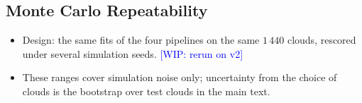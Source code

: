 \documentclass[twoside]{article}
\newcommand{\WIP}[1]{\textcolor{blue}{[WIP: #1]}}
\begin{document}
\subsection{Monte Carlo Repeatability}
\label{app:score-repeat}

\begin{itemize}
  \item Design: the same fits of the four pipelines on the same $1\,440$ clouds, rescored under several simulation
        seeds. \WIP{rerun on v2}
  \item These ranges cover simulation noise only; uncertainty from the choice of clouds is the bootstrap over test
        clouds in the main text.
\end{itemize}
\end{document}

